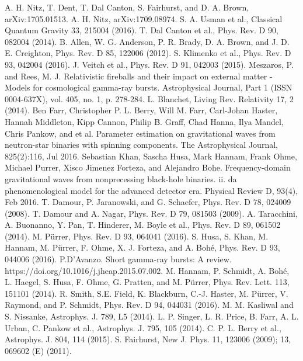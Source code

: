 \documentclass[binding=0.6cm, LaM]{sapthesis}
\begin{document}
\begin{thebibliography}{500}
	 A. H. Nitz, T. Dent, T. Dal Canton, S. Fairhurst, and D. A. Brown, arXiv:1705.01513.
	 A. H. Nitz, arXiv:1709.08974.
	 S. A. Usman et al., Classical Quantum Gravity 33, 215004 (2016).
	 T. Dal Canton et al., Phys. Rev. D 90, 082004 (2014). 
	 B. Allen, W. G. Anderson, P. R. Brady, D. A. Brown, and J. D. E. Creighton, Phys. Rev. D 85, 122006 (2012).
	 S. Klimenko et al., Phys. Rev. D 93, 042004 (2016).
	 J. Veitch et al., Phys. Rev. D 91, 042003 (2015).
	 Meszaros, P. and Rees, M. J. Relativistic fireballs and their impact on external matter - Models for cosmological gamma-ray bursts. Astrophysical Journal, Part 1 (ISSN 0004-637X), vol. 405, no. 1, p. 278-284. 
	 L. Blanchet, Living Rev. Relativity 17, 2 (2014).
	 Ben Farr, Christopher P. L. Berry, Will M. Farr, Carl-Johan Haster, Hannah Middleton, Kipp Cannon, Philip B. Graff, Chad Hanna, Ilya Mandel, Chris Pankow, and et al. Parameter estimation on gravitational waves from neutron-star binaries with spinning components. The Astrophysical Journal, 825(2):116, Jul 2016.
	Sebastian Khan, Sascha Husa, Mark Hannam, Frank Ohme, Michael Purrer, Xisco Jimenez Forteza, and Alejandro Bohe. Frequency-domain gravitational waves from nonprecessing black-hole binaries. ii. da phenomenological model for the advanced detector era. Physical Review D, 93(4), Feb 2016.  
	 T. Damour, P. Jaranowski, and G. Schaefer, Phys. Rev. D 78, 024009 (2008).
	 T. Damour and A. Nagar, Phys. Rev. D 79, 081503 (2009).
	 A. Taracchini, A. Buonanno, Y. Pan, T. Hinderer, M. Boyle et al., Phys. Rev. D 89, 061502 (2014).
	 M. Pürrer, Phys. Rev. D 93, 064041 (2016).
	 S. Husa, S. Khan, M. Hannam, M. Pürrer, F. Ohme, X. J. Forteza, and A. Bohé, Phys. Rev. D 93, 044006 (2016). 
	 P.D'Avanzo. Short gamma-ray bursts: A review. https://doi.org/10.1016/j.jheap.2015.07.002. 
	 M. Hannam, P. Schmidt, A. Bohé, L. Haegel, S. Husa, F. Ohme, G. Pratten, and M. Pürrer, Phys. Rev. Lett. 113, 151101 (2014).
	 R. Smith, S.E. Field, K. Blackburn, C.-J. Haster, M. Pürrer, V. Raymond, and P. Schmidt, Phys. Rev. D 94, 044031 (2016).
	 M. M. Kasliwal and S. Nissanke, Astrophys. J. 789, L5 (2014). 
	 L. P. Singer, L. R. Price, B. Farr, A. L. Urban, C. Pankow et al., Astrophys. J. 795, 105 (2014). 
	 C. P. L. Berry et al., Astrophys. J. 804, 114 (2015). 
	 S. Fairhurst, New J. Phys. 11, 123006 (2009); 13, 069602 (E) (2011). 

\end{thebibliography}
\end{document}
